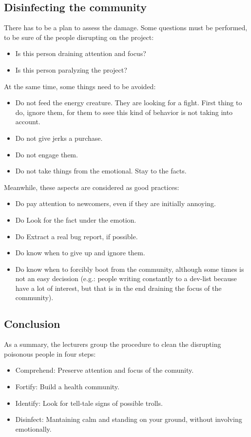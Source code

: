 \documentclass[11pt]{article}
\begin{document}
\subsection{Disinfecting the community}
There has to be a plan to assess the damage. Some questions must be performed, to be sure of the people disrupting on the project:
\begin{itemize}\itemsep0pt
\item{Is this person draining attention and focus?}
\item{Is this person paralyzing the project?}
\end{itemize}
At the same time, some things need to be avoided:
\begin{itemize}\itemsep0pt
\item{Do not feed the energy creature. They are looking for a fight. First thing to do, ignore them, for them to ssee this kind of behavior is not taking into account.}
\item{Do not give jerks a purchase.}
\item{Do not engage them.}
\item{Do not take things from the emotional. Stay to the facts.}
\end{itemize}
Meanwhile, these aspects are considered as good practices:
\begin{itemize}\itemsep0pt
\item{Do pay attention to newcomers, even if they are initially annoying.}
\item{Do Look for the fact under the emotion.}
\item{Do Extract a real bug report, if possible.}
\item{Do know when to give up and ignore them.}
\item{Do know when to forcibly boot from the community, although some times is not an easy decission (e.g.: people writing constantly to a dev-list because have a lot of interest, but that is in the end draining the focus of the community).}
\end{itemize}

\subsection{Conclusion}
As a summary, the lecturers group the procedure to clean the disrupting poisonous people in four steps:
\begin{itemize}\itemsep0pt
\item{Comprehend}: Preserve attention and focus of the comunity.
\item{Fortify}: Build a health community.
\item{Identify}: Look for tell-tale signs of possible trolls.
\item{Disinfect}: Mantaining calm and standing on your ground, without involving emotionally.
\end{itemize}
\end{document}
